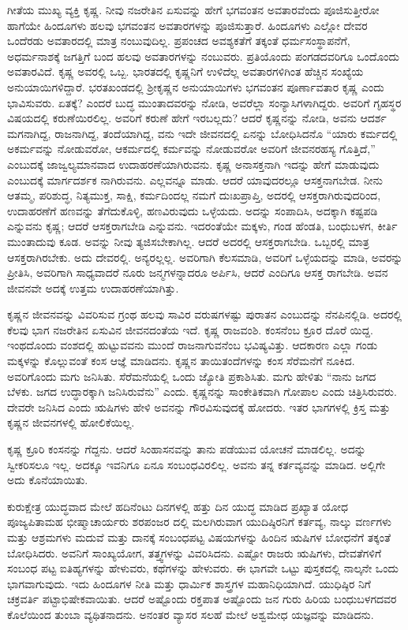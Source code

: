 ಗೀತೆಯ ಮುಖ್ಯ ವ್ಯಕ್ತಿ ಕೃಷ್ಣ. ನೀವು ನಜರೇತಿನ ಏಸುವನ್ನು ಹೇಗೆ ಭಗವಂತನ ಅವತಾರವೆಂದು ಪೂಜಿಸುತ್ತೀರೋ ಹಾಗೆಯೇ ಹಿಂದೂಗಳು ಹಲವು ಭಗವಂತನ ಅವತಾರಗಳನ್ನು ಪೂಜಿಸುತ್ತಾರೆ. ಹಿಂದೂಗಳು ಎಲ್ಲೋ ದೇವರ ಒಂದೆರಡು ಅವತಾರದಲ್ಲಿ ಮಾತ್ರ ನಂಬುವುದಿಲ್ಲ. ಪ್ರಪಂಚದ ಅವಶ್ಯಕತೆಗೆ ತಕ್ಕಂತೆ ಧರ್ಮಸಂಸ್ಥಾಪನೆಗೆ, ಅಧರ್ಮನಾಶಕ್ಕೆ ಜಗತ್ತಿಗೆ ಬಂದ ಹಲವು ಅವತಾರಗಳನ್ನು ನಂಬುವರು. ಪ್ರತಿಯೊಂದು ಪಂಗಡದವರಿಗೂ ಒಂದೊಂದು ಅವತಾರವಿದೆ. ಕೃಷ್ಣ ಅವರಲ್ಲಿ ಒಬ್ಬ. ಭಾರತದಲ್ಲಿ ಕೃಷ್ಣನಿಗೆ ಉಳಿದೆಲ್ಲ ಅವತಾರಗಳಿಗಿಂತ ಹೆಚ್ಚಿನ ಸಂಖ್ಯೆಯ ಅನುಯಾಯಿಗಳಿದ್ದಾರೆ. ಭರತಖಂಡದಲ್ಲಿ ಶ‍್ರೀಕೃಷ್ಣನ ಅನುಯಾಯಿಗಳು ಭಗವಂತನ ಪೂರ್ಣಾವತಾರ ಕೃಷ್ಣ ಎಂದು ಭಾವಿಸುವರು. ಏತಕ್ಕೆ? ಎಂದರೆ ಬುದ್ಧ ಮುಂತಾದವರನ್ನು ನೋಡಿ, ಅವರೆಲ್ಲಾ ಸಂನ್ಯಾಸಿಗಳಾಗಿದ್ದರು. ಅವರಿಗೆ ಗೃಹಸ್ಥರ ವಿಷಯದಲ್ಲಿ ಕರುಣೆಯಿರಲಿಲ್ಲ. ಅವರಿಗೆ ಕರುಣೆ ಹೇಗೆ ಇರಬಲ್ಲದು? ಆದರೆ ಕೃಷ್ಣನನ್ನು ನೋಡಿ, ಅವನು ಆದರ್ಶ ಮಗನಾಗಿದ್ದ, ರಾಜನಾಗಿದ್ದ, ತಂದೆಯಾಗಿದ್ದ, ವನು ಇದೇ ಜೀವನದಲ್ಲಿ ಏನನ್ನು ಬೋಧಿಸಿದನೊ “ಯಾರು ಕರ್ಮದಲ್ಲಿ ಅಕರ್ಮವನ್ನು ನೋಡುವರೋ, ಆಕರ್ಮದಲ್ಲಿ ಕರ್ಮವನ್ನು ನೋಡುವರೋ ಅವರಿಗೆ ಜೀವನರಹಸ್ಯ ಗೊತ್ತಿದೆ,” ಎಂಬುದಕ್ಕೆ ಜಾಜ್ವಲ್ಯಮಾನವಾದ ಉದಾಹರಣೆಯಾಗಿರುವನು. ಕೃಷ್ಣ ಅನಾಸಕ್ತನಾಗಿ ಇದನ್ನು ಹೇಗೆ ಮಾಡುವುದು ಎಂಬುದಕ್ಕೆ ಮಾರ್ಗದರ್ಶಕ ನಾಗಿರುವನು. ಎಲ್ಲವನ್ನೂ ಮಾಡು. ಆದರೆ ಯಾವುದರಲ್ಲೂ ಆಸಕ್ತನಾಗಬೇಡ. ನೀನು ಆತಮ್ಮ, ಪರಿಶುದ್ಧ, ನಿತ್ಯಮುಕ್ತ, ಸಾಕ್ಷಿ, ಕರ್ಮದಿಂದಲ್ಲ ನಮಗೆ ದುಃಖಪ್ರಾಪ್ತಿ, ಅದರಲ್ಲಿ ಆಸಕ್ತರಾಗಿರುವುದರಿಂದ, ಉದಾಹರಣೆಗೆ ಹಣವನ್ನು ತೆಗೆದುಕೊಳ್ಳಿ, ಹಣವಿರುವುದು ಒಳ್ಳೆಯದು. ಅದನ್ನು ಸಂಪಾದಿಸಿ, ಅದಕ್ಕಾಗಿ ಕಷ್ಟಪಡಿ ಎನ್ನುವನು ಕೃಷ್ಣ; ಆದರೆ ಆಸಕ್ತರಾಗಬೇಡಿ ಎನ್ನುವನು. ಇದರಂತೆಯೇ ಮಕ್ಕಳು, ಗಂಡ ಹೆಂಡತಿ, ಬಂಧುಬಳಗ, ಕೀರ್ತಿ ಮುಂತಾದುವು ಕೂಡ. ಅವನ್ನು ನೀವು ತ್ಯಜಿಸಬೇಕಾಗಿಲ್ಲ. ಆದರೆ ಅದರಲ್ಲಿ ಆಸಕ್ತರಾಗಬೇಡಿ. ಒಬ್ಬರಲ್ಲಿ ಮಾತ್ರ ಆಸಕ್ತರಾಗಿರಬೇಕು. ಅದು ದೇವರಲ್ಲಿ. ಅನ್ಯರಲ್ಲಲ್ಲ. ಅವರಿಗಾಗಿ ಕೆಲಸಮಾಡಿ, ಅವರಿಗೆ ಒಳ್ಳೆಯದನ್ನು ಮಾಡಿ, ಅವರನ್ನು ಪ್ರೀತಿಸಿ, ಅವರಿಗಾಗಿ ಸಾಧ್ಯವಾದರೆ ನೂರು ಜನ್ಮಗಳನ್ನಾದರೂ ಅರ್ಪಿಸಿ, ಆದರೆ ಎಂದಿಗೂ ಆಸಕ್ತ ರಾಗಬೇಡಿ. ಅವನ ಜೀವನವೇ ಅದಕ್ಕೆ ಉತ್ತಮ ಉದಾಹರಣೆಯಾಗಿತ್ತು.

ಕೃಷ್ಣನ ಜೀವನವನ್ನು ವಿವರಿಸುವ ಗ್ರಂಥ ಹಲವು ಸಾವಿರ ವರುಷಗಳಷ್ಟು ಪುರಾತನ ಎಂಬುದನ್ನು ನೆನಪಿನಲ್ಲಿಡಿ. ಅದರಲ್ಲಿ ಕೆಲವು ಭಾಗ ನಜರೇತಿನ ಏಸುವಿನ ಜೀವನದಂತೆಯ ಇದೆ. ಕೃಷ್ಣ ರಾಜವಂಶಿ. ಕಂಸನೆಂಬ ಕ್ರೂರ ದೊರೆ ಯಿದ್ದ. ಇಂಥದೊಂದು ವಂಶದಲ್ಲಿ ಹುಟ್ಟುವವನು ಮುಂದೆ ರಾಜನಾಗುವನೆಂಬ ಭವಿಷ್ಯವಿತ್ತು. ಆದಕಾರಣ ಎಲ್ಲಾ ಗಂಡು ಮಕ್ಕಳನ್ನು ಕೊಲ್ಲುವಂತೆ ಕಂಸ ಆಜ್ಞೆ ಮಾಡಿದನು. ಕೃಷ್ಣನ ತಾಯಿತಂದೆಗಳನ್ನು ಕಂಸ ಸೆರೆಮನೆಗೆ ನೂಕಿದ. ಅವರಿಗೊಂದು ಮಗು ಜನಿಸಿತು. ಸೆರೆಮನೆಯಲ್ಲಿ ಒಂದು ಜ್ಯೋತಿ ಪ್ರಕಾಶಿಸಿತು. ಮಗು ಹೇಳಿತು “ನಾನು ಜಗದ ಬೆಳಕು. ಜಗದ ಉದ್ಧಾರಕ್ಕಾಗಿ ಜನಿಸಿರುವೆನು” ಎಂದು. ಕೃಷ್ಣನನ್ನು ಸಾಂಕೇತಿಕವಾಗಿ ಗೋಪಾಲ ಎಂದು ಚಿತ್ರಿಸಿರುವರು. ದೇವರೇ ಜನಿಸಿದ ಎಂದು ಋಷಿಗಳು ಹೇಳಿ ಅವನನ್ನು ಗೌರವಿಸುವುದಕ್ಕೆ ಹೋದರು. ಇತರ ಭಾಗಗಳಲ್ಲಿ ಕ್ರಿಸ್ತ ಮತ್ತು ಕೃಷ್ಣನ ಜೀವನಗಳಲ್ಲಿ ಹೋಲಿಕೆಯಿಲ್ಲ.

ಕೃಷ್ಣ ಕ್ರೂರಿ ಕಂಸನನ್ನು ಗೆದ್ದನು. ಆದರೆ ಸಿಂಹಾಸನವನ್ನು ತಾನು ಪಡೆಯುವ ಯೋಚನೆ ಮಾಡಲಿಲ್ಲ. ಅದನ್ನು ಸ್ವೀಕರಿಸಲೂ ಇಲ್ಲ. ಅದಕ್ಕೂ ಇವನಿಗೂ ಏನೂ ಸಂಬಂಧವಿರಲಿಲ್ಲ. ಅವನು ತನ್ನ ಕರ್ತವ್ಯವನ್ನು ಮಾಡಿದ. ಅಲ್ಲಿಗೇ ಅದು ಕೊನೆಯಾಯಿತು.

ಕುರುಕ್ಷೇತ್ರ ಯುದ್ಧವಾದ ಮೇಲೆ ಹದಿನೆಂಟು ದಿನಗಳಲ್ಲಿ ಹತ್ತು ದಿನ ಯುದ್ಧ ಮಾಡಿದ ಪ್ರಖ್ಯಾತ ಯೋಧ ಪೂಜ್ಯಪಿತಾಮಹ ಭೀಷ್ಮಾಚಾರ್ಯರು ಶರಪಂಜರ ದಲ್ಲಿ ಮಲಗಿರುವಾಗ ಯುದಿಷ್ಠಿರನಿಗೆ ಕರ್ತವ್ಯ, ನಾಲ್ಕು ವರ್ಣಗಳು ಮತ್ತು ಆಶ್ರಮಗಳು ಮದುವೆ ಮತ್ತು ದಾನಕ್ಕೆ ಸಂಬಂಧಪಟ್ಟ ವಿಷಯಗಳನ್ನು ಹಿಂದಿನ ಋಷಿಗಳ ಬೋಧನೆಗೆ ತಕ್ಕಂತೆ ಬೋಧಿಸಿದರು. ಅವನಿಗೆ ಸಾಂಖ್ಯಯೋಗ, ತತ್ತ್ವಗಳನ್ನು ವಿವರಿಸಿದನು. ಎಷ್ಟೋ ರಾಜರು ಋಷಿಗಳು, ದೇವತೆಗಳಿಗೆ ಸಂಬಂಧ ಪಟ್ಟ ಐತಿಹ್ಯಗಳನ್ನು ಹೇಳುವರು, ಕಥೆಗಳನ್ನು ಹೇಳುವರು. ಈ ಭಾಗವೇ ಒಟ್ಟು ಪುಸ್ತಕದಲ್ಲಿ ನಾಲ್ಕನೇ ಒಂದು ಭಾಗವಾಗುವುದು. ಇದು ಹಿಂದೂಗಳ ನೀತಿ ಮತ್ತು ಧಾರ್ಮಿಕ ಶಾಸ್ತ್ರಗಳ ಮಹಾನಿಧಿಯಾಗಿದೆ. ಯುಧಿಷ್ಠಿರ ನಿಗೆ ಚಕ್ರವರ್ತಿ ಪಟ್ಟಾಭಿಷೇಕವಾಯಿತು. ಆದರೆ ಅಷ್ಟೊಂದು ರಕ್ತಪಾತ ಅಷ್ಟೊಂದು ಜನ ಗುರು ಹಿರಿಯ ಬಂಧುಬಳಗದವರ ಕೊಲೆಯಿಂದ ತುಂಬಾ ವ್ಯಥಿತನಾದನು. ಅನಂತರ ವ್ಯಾಸರ ಸಲಹೆ ಮೇಲೆ ಅಶ್ವಮೇಧ ಯಜ್ಞವನ್ನು ಮಾಡಿದನು.

